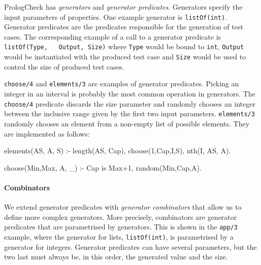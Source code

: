\documentclass[runningheads,a4paper]{../../PaperStyles/llncs}
\newcommand{\yap}[1]{\lstinline[style=yap]{#1}}
\newcommand{\plqc}[0]{{\sf PrologCheck}}
\begin{document}
\plqc{} has {\it generators} and {\it generator
predicates}.
%
Generators specify the input parameters of properties.
%
One example generator is \yap{listOf(int)}.
%
Generator predicates are the predicates responsible for the generation
of test cases.
%
The corresponding example of a call to a generator predicate is \yap{listOf(Type,
  Output, Size)} where \yap{Type} would be bound to \yap{int},
\yap{Output} would be instantiated with the produced test case and
\yap{Size} would be used to control the size of produced test cases.
%


%

  \yap{choose/4} and \yap{elements/3} are examples of generator
predicates.
%
Picking an integer in an interval is probably the most common operation
in generators.
%
The \yap{choose/4} predicate discards the size parameter and randomly
chooses an integer between the inclusive range given by the first two
input parameters.
%
\yap{elements/3}  randomly chooses an element
from a non-empty list of possible elements.
%
They are implemented as follows:
\begin{yapcode}
 elements(AS, A, S) :-
   length(AS, Cap), choose(1,Cap,I,S), nth(I, AS, A).

 choose(Min,Max, A, _) :- Cap is Max+1, random(Min,Cap,A).
\end{yapcode}


\paragraph{\bf Combinators}

We extend generator predicates with \emph{generator combinators} that
allow us to define more complex generators.
%
More precisely, combinators are generator predicates that are parametrised by
generators.
%
This is shown in the \yap{app/3} example, where the generator for lists,
\yap{listOf(int)}, is parametrised by a generator for integers.
%
Generator predicates can have several parameters, but the two last
must always be, in this order, the generated value and the size.
%
\end{document}
